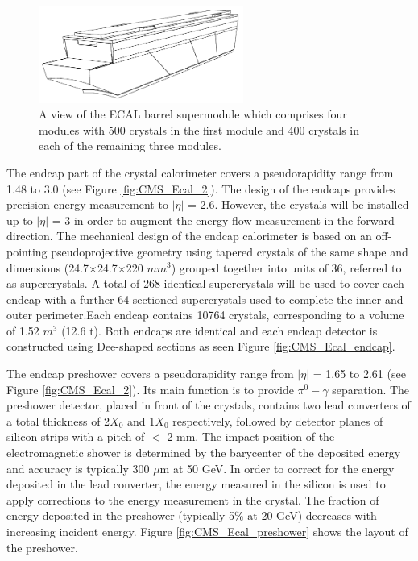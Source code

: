 \begin{figure}[h!]
\begin{center}
\includegraphics[width=0.6\textwidth]{figures/CMS/ECAL/cms_ecalSupermodule.png}
\caption{A view of the ECAL barrel supermodule which comprises four modules with 500 crystals in the first module and 400 crystals in each of the remaining three modules.}
\label{fig:CMS_Ecal_Barrel_supermodule}
\end{center}
\end{figure}

The endcap part of the crystal calorimeter covers a pseudorapidity range from 1.48 to 3.0 (see Figure \ref{fig:CMS_Ecal_2}). The design of the endcaps provides precision energy measurement to $|\eta|$ = 2.6. However, the crystals will be installed up to $|\eta|$ = 3 in order to augment the energy-flow measurement in the forward direction. The mechanical design of the endcap calorimeter is based on an off-pointing pseudoprojective geometry using tapered crystals of the same shape and dimensions (24.7$\times$24.7$\times$220 $mm^{3}$) grouped together into units of 36, referred to as supercrystals. A total of 268 identical supercrystals will be used to cover each endcap with a further 64 sectioned supercrystals used to complete the inner and outer perimeter.Each endcap contains 10764 crystals, corresponding to a volume of 1.52 $m^{3}$ (12.6 t). Both endcaps are identical and each endcap detector is constructed using Dee-shaped sections as seen Figure \ref{fig:CMS_Ecal_endcap}.

The endcap preshower covers a pseudorapidity range from $|\eta|$ = 1.65 to 2.61 (see Figure \ref{fig:CMS_Ecal_2}). Its main function is to provide $\pi^{0}-\gamma$ separation. The preshower detector, placed in front of the crystals, contains two lead converters of a total thickness of 2$X_{0}$ and 1$X_{0}$ respectively, followed by detector planes of silicon strips with a pitch of $<$ 2 mm. The impact position of the electromagnetic shower is determined by the barycenter of the deposited energy and accuracy is typically 300 $\mu$m at 50 GeV. In order to correct for the energy deposited in the lead converter, the energy measured in the silicon is used to apply corrections to the energy measurement in the crystal. The fraction of energy deposited in the preshower (typically 5\% at 20 GeV) decreases with increasing incident energy. Figure \ref{fig:CMS_Ecal_preshower} shows the layout of the preshower.

